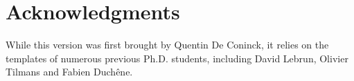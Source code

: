 \chapter*{Acknowledgments}

While this version was first brought by Quentin De Coninck, it relies on the templates of numerous previous Ph.D. students, including David Lebrun, Olivier Tilmans and Fabien Duchêne.